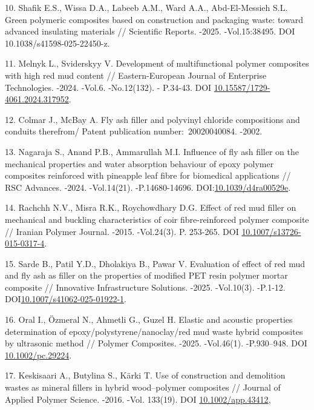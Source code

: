 \begin{refs}
10. Shafik E.S., Wissa D.A., Labeeb A.M., Ward A.A., Abd-El-Messieh S.L.
Green polymeric composites based on construction and packaging waste:
toward advanced insulating materials // Scientific Reports. -2025.
-Vol.15:38495. DOI 10.1038/s41598-025-22450-z.

11. Melnyk L., Sviderskyy V. Development of multifunctional polymer
composites with high red mud content // Eastern-European Journal of
Enterprise Technologies. -2024. -Vol.6. -No.12(132). - P.34-43. DOI
\href{https://doi.org/10.15587/1729-4061.2024.317952}{10.15587/1729-4061.2024.317952}.

12. Colmar J., McBay A. Fly ash filler and polyvinyl chloride compositions
and conduits therefrom/ Patent publication number:~20020040084. -2002.

13. Nagaraja S., Anand P.B., Ammarullah M.I. Influence of fly ash filler
on the mechanical properties and water absorption behaviour of epoxy
polymer composites reinforced with pineapple leaf fibre for biomedical
applications // RSC Advances. -2024. -Vol.14(21). -P.14680-14696.
DOI:\href{https://doi.org/10.1039/d4ra00529e}{10.1039/d4ra00529e}.

14. Rachchh N.V., Misra R.K., Roychowdhary D.G. Effect of red mud filler
on mechanical and buckling characteristics of coir fibre-reinforced
polymer composite // Iranian Polymer Journal. -2015. -Vol.24(3). P.
253-265. DOI
\href{https://doi.org/10.1007/s13726-015-0317-4?urlappend=\%3Futm_source\%3Dresearchgate.net\%26utm_medium\%3Darticle}{10.1007/s13726-015-0317-4}.

15. Sarde B., Patil Y.D., Dholakiya B., Pawar V. Evaluation of effect of
red mud and fly ash as filler on the properties of modified PET resin
polymer mortar composite // Innovative Infrastructure Solutions.
-2025. -Vol.10(3). -P.1-12.
DOI\href{https://ui.adsabs.harvard.edu/link_gateway/2025InnIS..10..117S/doi:10.1007/s41062-025-01922-1}{10.1007/s41062-025-01922-1}.

16. Oral I., Özmeral N., Ahmetli G., Guzel H. Elastic and acoustic
properties determination of epoxy/polystyrene/nanoclay/red mud waste
hybrid composites by ultrasonic method // Polymer Composites. -2025.
-Vol.46(1). -P.930--948. DOI
\href{https://doi.org/10.1002/pc.29224}{10.1002/pc.29224}.

17. Keskisaari A., Butylina S., Kärki T. Use of construction and
demolition wastes as mineral fillers in hybrid wood--polymer
composites // Journal of Applied Polymer Science. -2016. -Vol.
133(19). DOI
\href{https://doi.org/10.1002/app.43412?urlappend=\%3Futm_source\%3Dresearchgate.net\%26utm_medium\%3Darticle}{10.1002/app.43412},


\end{refs}

